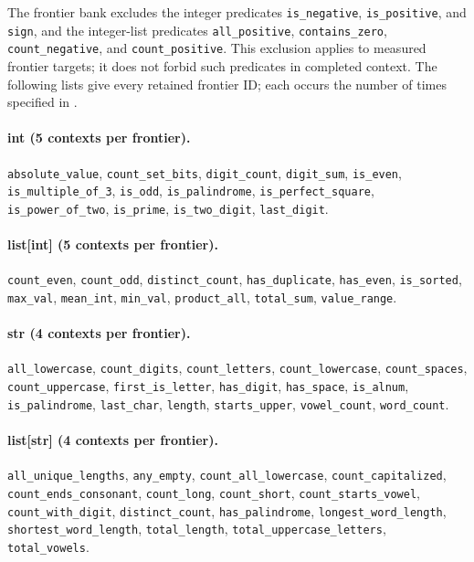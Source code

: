 The frontier bank excludes the integer predicates \texttt{is\_negative}, \texttt{is\_positive}, and \texttt{sign}, and the integer-list predicates \texttt{all\_positive}, \texttt{contains\_zero}, \texttt{count\_negative}, and \texttt{count\_positive}. This exclusion applies to measured frontier targets; it does not forbid such predicates in completed context. The following lists give every retained frontier ID; each occurs the number of times specified in .

\paragraph{int (5 contexts per frontier).}
\texttt{absolute\_value}, \texttt{count\_set\_bits}, \texttt{digit\_count}, \texttt{digit\_sum}, \texttt{is\_even}, \texttt{is\_multiple\_of\_3}, \texttt{is\_odd}, \texttt{is\_palindrome}, \texttt{is\_perfect\_square}, \texttt{is\_power\_of\_two}, \texttt{is\_prime}, \texttt{is\_two\_digit}, \texttt{last\_digit}.

\paragraph{list[int] (5 contexts per frontier).}
\texttt{count\_even}, \texttt{count\_odd}, \texttt{distinct\_count}, \texttt{has\_duplicate}, \texttt{has\_even}, \texttt{is\_sorted}, \texttt{max\_val}, \texttt{mean\_int}, \texttt{min\_val}, \texttt{product\_all}, \texttt{total\_sum}, \texttt{value\_range}.

\paragraph{str (4 contexts per frontier).}
\texttt{all\_lowercase}, \texttt{count\_digits}, \texttt{count\_letters}, \texttt{count\_lowercase}, \texttt{count\_spaces}, \texttt{count\_uppercase}, \texttt{first\_is\_letter}, \texttt{has\_digit}, \texttt{has\_space}, \texttt{is\_alnum}, \texttt{is\_palindrome}, \texttt{last\_char}, \texttt{length}, \texttt{starts\_upper}, \texttt{vowel\_count}, \texttt{word\_count}.

\paragraph{list[str] (4 contexts per frontier).}
\texttt{all\_unique\_lengths}, \texttt{any\_empty}, \texttt{count\_all\_lowercase}, \texttt{count\_capitalized}, \texttt{count\_ends\_consonant}, \texttt{count\_long}, \texttt{count\_short}, \texttt{count\_starts\_vowel}, \texttt{count\_with\_digit}, \texttt{distinct\_count}, \texttt{has\_palindrome}, \texttt{longest\_word\_length}, \texttt{shortest\_word\_length}, \texttt{total\_length}, \texttt{total\_uppercase\_letters}, \texttt{total\_vowels}.

